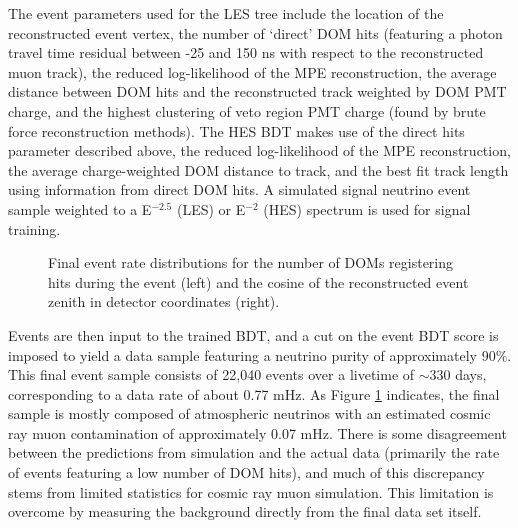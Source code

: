 \documentclass[manuscript]{aastex}
\begin{document}
The event parameters used for the LES tree include the location of the reconstructed event vertex, the number of `direct' DOM hits (featuring a photon travel time residual between -25 and 150 ns with respect to the reconstructed muon track), the reduced log-likelihood of the MPE reconstruction, the average distance between DOM hits and the reconstructed track weighted by DOM PMT charge, and the highest clustering of veto region PMT charge (found by brute force reconstruction methods). The HES BDT makes use of the direct hits parameter described above, the reduced log-likelihood of the MPE reconstruction, the average charge-weighted DOM distance to track, and the best fit track length using information from direct DOM hits. A simulated signal neutrino event sample weighted to a E$^{-2.5}$ (LES) or E$^{-2}$ (HES) spectrum is used for signal training.
\begin{figure}[ht]
\caption[Final Sample Event Parameter Distributions]{Final event rate distributions for the number of DOMs registering hits during the event (left) and the cosine of the reconstructed event zenith in detector coordinates (right).}
\label{fig:PostBDTDistributions}
\end{figure}

Events are then input to the trained BDT, and a cut on the event BDT score is imposed to yield a data sample featuring a neutrino purity of approximately 90$\%$. This final event sample consists of 22,040 events over a livetime of $\sim$330 days, corresponding to a data rate of about 0.77 mHz. As Figure \ref{fig:PostBDTDistributions} indicates, the final sample is mostly composed of atmospheric neutrinos with an estimated cosmic ray muon contamination of approximately 0.07 mHz. There is some disagreement between the predictions from simulation and the actual data (primarily the rate of events featuring a low number of DOM hits), and much of this discrepancy stems from limited statistics for cosmic ray muon simulation. This limitation is overcome by measuring the background directly from the final data set itself.
\end{document}
